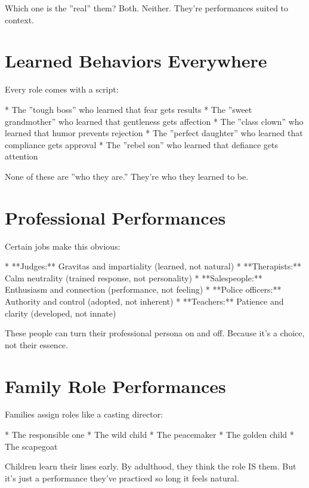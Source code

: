 \documentclass[12pt,oneside]{book}
\begin{document}
Which one is the ''real'' them? Both. Neither. They're performances suited to context.

\section{Learned Behaviors Everywhere}

Every role comes with a script:

                    * The ''tough boss'' who learned that fear gets results
                    * The ''sweet grandmother'' who learned that gentleness gets affection
                    * The ''class clown'' who learned that humor prevents rejection
                    * The ''perfect daughter'' who learned that compliance gets approval
                    * The ''rebel son'' who learned that defiance gets attention

None of these are ''who they are.'' They're who they learned to be.

\section{Professional Performances}

Certain jobs make this obvious:

                    * **Judges:** Gravitas and impartiality (learned, not natural)
                    * **Therapists:** Calm neutrality (trained response, not personality)
                    * **Salespeople:** Enthusiasm and connection (performance, not feeling)
                    * **Police officers:** Authority and control (adopted, not inherent)
                    * **Teachers:** Patience and clarity (developed, not innate)

These people can turn their professional persona on and off. Because it's a choice, not their essence.

\section{Family Role Performances}

Families assign roles like a casting director:

                    * The responsible one
                    * The wild child
                    * The peacemaker
                    * The golden child
                    * The scapegoat

Children learn their lines early. By adulthood, they think the role IS them. But it's just a performance they've practiced so long it feels natural.
\end{document}
